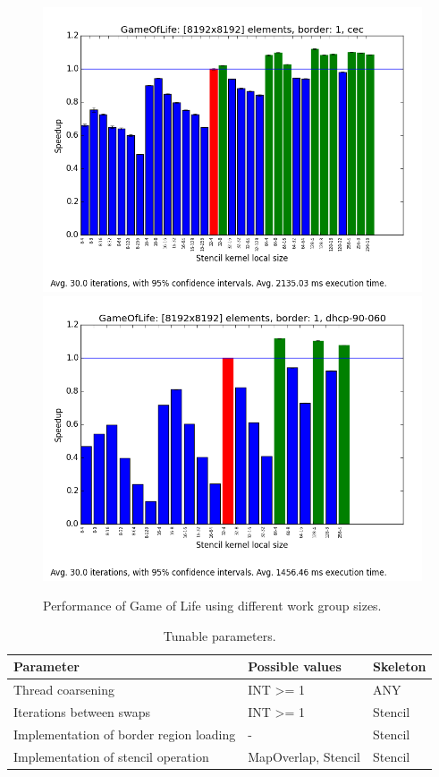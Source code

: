 \begin{figure}[h]
\includegraphics[width=\textwidth]{../../benchmarks/results/e4/GameOfLife-00008192-01-cec.png}
\includegraphics[width=\textwidth]{../../benchmarks/results/e4/GameOfLife-00008192-01-dhcp-90-060.png}
\caption{Performance of Game of Life using different work group
  sizes.}
\end{figure}


\begin{table}
\footnotesize
\centering
\begin{tabular}{| l | l | l |}
\hline
\textbf{Parameter} & \textbf{Possible values} & \textbf{Skeleton}\\
\hline
Thread coarsening & INT >= 1 & ANY\\
Iterations between swaps & INT >= 1 & Stencil\\
Implementation of border region loading & - & Stencil\\
Implementation of stencil operation & {MapOverlap, Stencil} & Stencil\\
\hline
\end{tabular}
\caption{Tunable parameters.}
\end{table}

